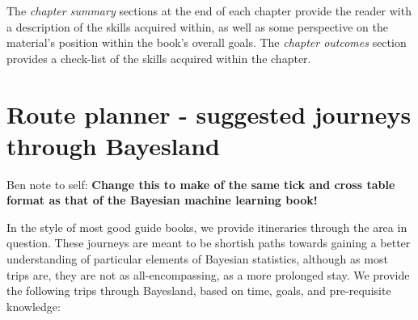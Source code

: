 \documentclass[11pt,fullpage]{book}
\begin{document}
The \textit{chapter summary} sections at the end of each chapter provide the reader with a description of the skills acquired within, as well as some perspective on the material's position within the book's overall goals. The \textit{chapter outcomes} section provides a check-list of the skills acquired within the chapter. 

\section{Route planner - suggested journeys through Bayesland}
Ben note to self: \textbf{Change this to make of the same tick and cross table format as that of the Bayesian machine learning book!}

In the style of most good guide books, we provide itineraries through the area in question. These journeys are meant to be shortish paths towards gaining a better understanding of particular elements of Bayesian statistics, although as most trips are, they are not as all-encompassing, as a more prolonged stay. We provide the following trips through Bayesland, based on time, goals, and pre-requisite knowledge:
\end{document}
